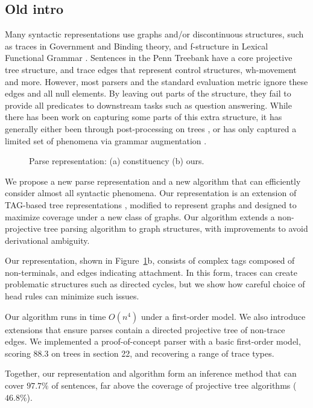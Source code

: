 \subsection{Old intro}

Many syntactic representations use graphs and/or discontinuous structures, such as traces in Government and Binding theory, and f-structure in Lexical Functional Grammar \cite{gb,Bresnan:1982}.
Sentences in the Penn Treebank \cite{ptb} have a core projective tree structure, and trace edges that represent control structures, wh-movement and more.
However, most parsers and the standard evaluation metric ignore these edges and all null elements.
By leaving out parts of the structure, they fail to provide all predicates to downstream tasks such as question answering.
While there has been work on capturing some parts of this extra structure, it has generally either been through post-processing on trees
\cite{Johnson:2002,Jijkoun:2003,Campbell:2004,Levy:2004,Gabbard:2006},
or has only captured a limited set of phenomena via grammar augmentation
\cite{collins:1997,dienes-dubey:2003,schmid:2006,cai-chiang-goldberg:2011}.

\begin{figure}
  \centering
  \scalebox{0.65}{
  
  }
  \vspace{-5mm}
  \caption{\label{fig:repr}
    Parse representation: (a) constituency (b) ours.
  }
\end{figure}

We propose a new parse representation and a new algorithm that can efficiently consider almost all syntactic phenomena.
Our representation is an extension of TAG-based tree representations \cite{cck,Shen:2007}, modified to represent graphs and designed to maximize coverage under a new class of graphs.
Our algorithm extends a non-projective tree parsing algorithm \cite{ec} to graph structures, with improvements to avoid derivational ambiguity.

Our representation, shown in Figure~\ref{fig:repr}b, consists of complex tags composed of non-terminals, and edges indicating attachment.
In this form, traces can create problematic structures such as directed cycles, but we show how careful choice of head rules can minimize such issues.

Our algorithm runs in time $O(n^4)$ under a first-order model.
We also introduce extensions that ensure parses contain a directed projective tree of non-trace edges.
We implemented a proof-of-concept parser with a basic first-order model, scoring $88.3$ on trees in section 22, and recovering a range of trace types.

Together, our representation and algorithm form an inference method that can cover $97.7\%$ of sentences, far above the coverage of projective tree algorithms ($46.8\%$).
